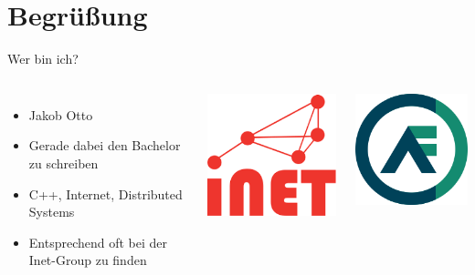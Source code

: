 
  \section{Begrüßung}
  \begin{frame} {Wer bin ich?}
    \begin{columns}
        \begin{itemize}
          \item Jakob Otto
          \item Gerade dabei den Bachelor zu schreiben
          \item C++, Internet, Distributed Systems
          \item Entsprechend oft bei der Inet-Group zu finden
        \end{itemize}
        \begin{center}
          \href{https://inet.haw-hamburg.de}{\includegraphics[width=.4\textwidth]
               {figs/inet_logo.png}\externalLink}
        \end{center}
        \begin{center}
          \href{https://actor-framework.org}{\includegraphics[width=.4\textwidth]
               {figs/caf_logo.png}\externalLink}
        \end{center}
    \end{columns}
  \end{frame}

